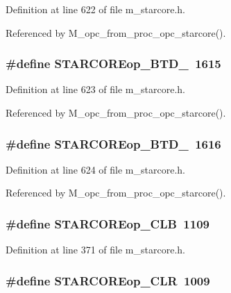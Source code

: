 Definition at line 622 of file m\_\-starcore.h.

Referenced by M\_\-opc\_\-from\_\-proc\_\-opc\_\-starcore().
\subsubsection{\setlength{\rightskip}{0pt plus 5cm}\#define STARCOREop\_\-BTD\_~1615}\label{m__starcore_8h_6ed973b839eb1705a50c247f9b693c21}




Definition at line 623 of file m\_\-starcore.h.

Referenced by M\_\-opc\_\-from\_\-proc\_\-opc\_\-starcore().
\subsubsection{\setlength{\rightskip}{0pt plus 5cm}\#define STARCOREop\_\-BTD\_~1616}\label{m__starcore_8h_e90251524906da24f1d04c7974f895e2}




Definition at line 624 of file m\_\-starcore.h.

Referenced by M\_\-opc\_\-from\_\-proc\_\-opc\_\-starcore().
\subsubsection{\setlength{\rightskip}{0pt plus 5cm}\#define STARCOREop\_\-CLB~1109}\label{m__starcore_8h_c8fec325e3553a2974090cec076d5759}




Definition at line 371 of file m\_\-starcore.h.
\subsubsection{\setlength{\rightskip}{0pt plus 5cm}\#define STARCOREop\_\-CLR~1009}\label{m__starcore_8h_1348da4ea83b06411bfde770b0504acd}




